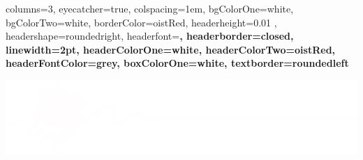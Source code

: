 \documentclass[
    a0paper, %
    portrait, %
    fontscale=0.4 %
    ]{baposter}
\begin{document}
\begin{poster}{ %
    columns=3, %
    eyecatcher=true, %
    colspacing=1em, %
    bgColorOne=white, %
    bgColorTwo=white, %
    borderColor=oistRed, %
    headerheight=0.01 \textheight, %
    headershape=roundedright, %
    headerfont=\Large\bf\textsc, %
    headerborder=closed, %
    linewidth=2pt, %
    headerColorOne=white, %
    headerColorTwo=oistRed, %
    headerFontColor=grey, %
    boxColorOne=white, %
    textborder=roundedleft %
}{}{}{}{} %


\begin{posterbox}[
    name = message,  %
    column = 0, %
    span = 3, %
    boxColorOne=oistRed, %
    headershade=plain,  %
    headerColorOne=oistRed %
    ]{}
    \fontsize{45}{50} \selectfont  \color{white} %
    
    \includegraphics[width=\textwidth, trim= 3 0 3 10]{footer-white.png}

    \hspace{1em}
    \begin{minipage}[c][ 0.4 \textheight ]{0.6\textwidth}


\end{minipage}
\end{posterbox}
\end{poster}
\end{document}
